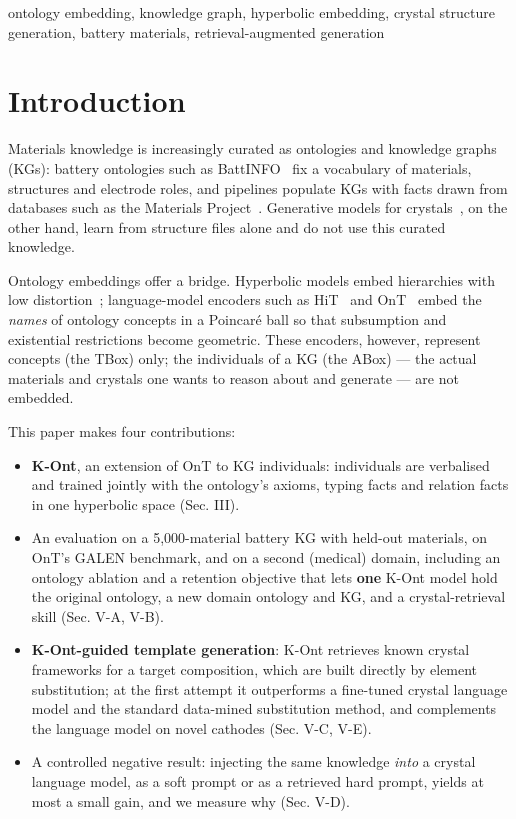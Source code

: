 \documentclass[conference]{IEEEtran}
\begin{document}
\begin{IEEEkeywords}
ontology embedding, knowledge graph, hyperbolic embedding, crystal structure generation, battery materials, retrieval-augmented generation
\end{IEEEkeywords}
\section{Introduction}
Materials knowledge is increasingly curated as ontologies and knowledge graphs (KGs): battery ontologies such as BattINFO~\cite{clark2022battinfo} fix a vocabulary of materials, structures and electrode roles, and pipelines populate KGs with facts drawn from databases such as the Materials Project~\cite{jain2013mp}. Generative models for crystals~\cite{xie2022cdvae,jiao2023diffcsp,antunes2024crystallm,zeni2025mattergen}, on the other hand, learn from structure files alone and do not use this curated knowledge.

Ontology embeddings offer a bridge. Hyperbolic models embed hierarchies with low distortion~\cite{nickel2017poincare}; language-model encoders such as HiT~\cite{he2024hit} and OnT~\cite{yang2025ont} embed the \emph{names} of ontology concepts in a Poincar\'e ball so that subsumption and existential restrictions become geometric. These encoders, however, represent concepts (the TBox) only; the individuals of a KG (the ABox) --- the actual materials and crystals one wants to reason about and generate --- are not embedded.

This paper makes four contributions:

\begin{itemize}
\item \textbf{K-Ont}, an extension of OnT to KG individuals: individuals are verbalised and trained jointly with the ontology's axioms, typing facts and relation facts in one hyperbolic space (Sec. III).
\item An evaluation on a 5,000-material battery KG with held-out materials, on OnT's GALEN benchmark, and on a second (medical) domain, including an ontology ablation and a retention objective that lets \textbf{one} K-Ont model hold the original ontology, a new domain ontology and KG, and a crystal-retrieval skill (Sec. V-A, V-B).
\item \textbf{K-Ont-guided template generation}: K-Ont retrieves known crystal frameworks for a target composition, which are built directly by element substitution; at the first attempt it outperforms a fine-tuned crystal language model and the standard data-mined substitution method, and complements the language model on novel cathodes (Sec. V-C, V-E).
\item A controlled negative result: injecting the same knowledge \emph{into} a crystal language model, as a soft prompt or as a retrieved hard prompt, yields at most a small gain, and we measure why (Sec. V-D).
\end{itemize}
\end{document}
